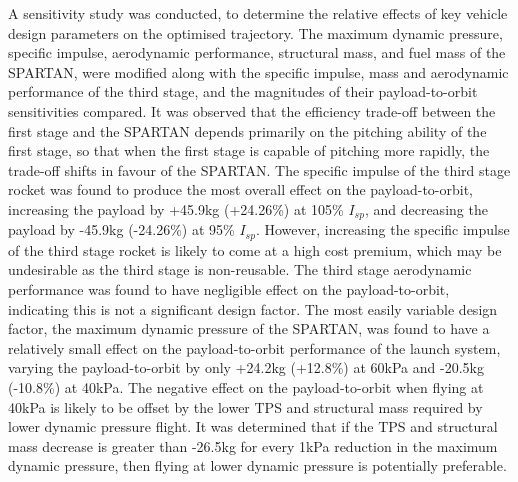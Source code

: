 A sensitivity study was conducted, to determine the relative effects of key vehicle design parameters on the optimised trajectory. 
The maximum dynamic pressure, specific impulse, aerodynamic performance, structural mass, and fuel mass of the SPARTAN, were modified along with the specific impulse, mass and aerodynamic performance of the third stage, and the magnitudes of their payload-to-orbit sensitivities compared. 
It was observed that the efficiency trade-off between the first stage and the SPARTAN depends primarily on the pitching ability of the first stage, so that when the first stage is capable of pitching more rapidly, the trade-off shifts in favour of the SPARTAN. 
The specific impulse of the third stage rocket was found to produce the most overall effect on the payload-to-orbit, increasing the payload by +45.9kg (+24.26\%) at 105\% $I_{sp}$, and decreasing the payload by -45.9kg (-24.26\%) at 95\% $I_{sp}$. However, increasing the specific impulse of the third stage rocket is likely to come at a high cost premium, which may be undesirable as the third stage is non-reusable. 
The third stage aerodynamic performance was found to have negligible effect on the payload-to-orbit, indicating this is not a significant design factor. 
The most easily variable design factor, the maximum dynamic pressure of the SPARTAN, was found to have a relatively small effect on the payload-to-orbit performance of the launch system, varying the payload-to-orbit by only +24.2kg (+12.8\%) at 60kPa and -20.5kg (-10.8\%) at 40kPa. The negative effect on the payload-to-orbit when flying at 40kPa is likely to be offset by the lower TPS and structural mass required by lower dynamic pressure flight. It was determined that if the TPS and structural mass decrease is greater than -26.5kg for every 1kPa reduction in the maximum dynamic pressure, then flying at lower dynamic pressure is potentially preferable. 







